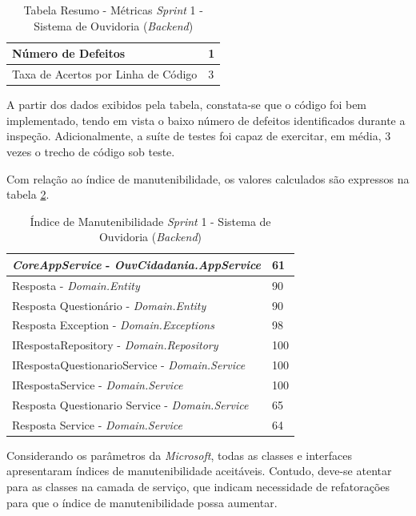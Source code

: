 \begin{table}[h]
\caption{Tabela Resumo - Métricas \textit{Sprint} 1 - Sistema de Ouvidoria (\textit{Backend})}
\centering
\begin{tabular}{ | m{8cm} | m{8cm} | } 
\hline
Número de Defeitos & 1 \\ 
\hline
Taxa de Acertos por Linha de Código & 3 \\ 
\hline
\end{tabular}
\label{table:tabela5}
\end{table}

A partir dos dados exibidos pela tabela, constata-se que o código foi bem implementado, tendo em vista o baixo número de defeitos identificados durante a inspeção. Adicionalmente, a suíte de testes foi capaz de exercitar, em média, 3 vezes o trecho de código sob teste.

Com relação ao índice de manutenibilidade, os valores calculados são expressos na tabela \ref{table:tabela6}.

\begin{table}[h]
\caption{Índice de Manutenibilidade \textit{Sprint} 1 - Sistema de Ouvidoria (\textit{Backend})}
\centering
\begin{tabular}{ | m{12cm} | m{4cm} | } 
\hline
\textit{CoreAppService} - \textit{OuvCidadania.AppService} & 61 \\ 
\hline
Resposta - \textit{Domain.Entity} & 90 \\ 
\hline
Resposta Questionário - \textit{Domain.Entity} & 90 \\ 
\hline
Resposta Exception - \textit{Domain.Exceptions} & 98 \\ 
\hline
IRespostaRepository - \textit{Domain.Repository} & 100 \\
\hline
IRespostaQuestionarioService - \textit{Domain.Service} & 100 \\
\hline
IRespostaService - \textit{Domain.Service} & 100 \\
\hline
Resposta Questionario Service - \textit{Domain.Service} & 65 \\
\hline
Resposta Service - \textit{Domain.Service} & 64 \\
\hline
\end{tabular}
\label{table:tabela6}
\end{table}

Considerando os parâmetros da \textit{Microsoft}, todas as classes e interfaces apresentaram índices de manutenibilidade aceitáveis. Contudo, deve-se atentar para as classes na camada de serviço, que indicam necessidade de refatorações para que o índice de manutenibilidade possa aumentar.


